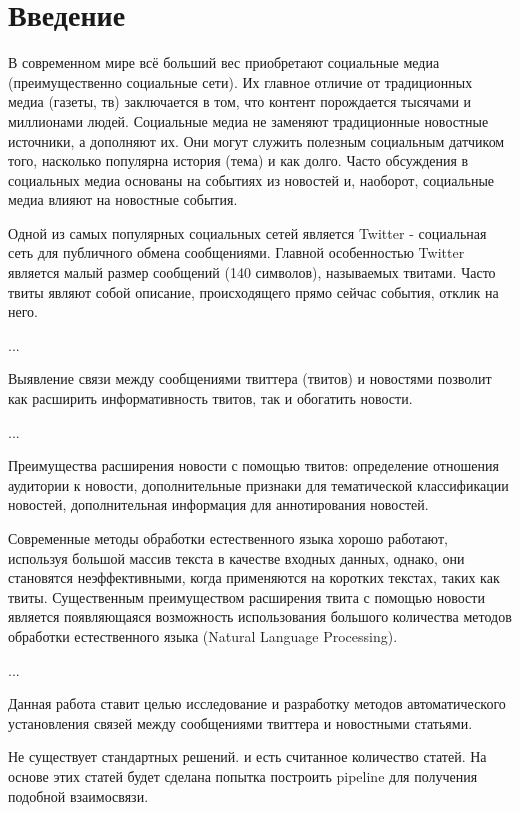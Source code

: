 \section*{Введение}
    В современном мире всё больший вес приобретают социальные медиа (преимущественно социальные сети). Их главное отличие от традиционных медиа (газеты, тв) заключается в том, что контент порождается тысячами и миллионами людей. Социальные медиа не заменяют традиционные новостные источники, а дополняют их. Они могут служить полезным социальным датчиком того, насколько популярна история (тема) и как долго. Часто обсуждения в социальных медиа основаны на событиях из новостей и, наоборот, социальные медиа влияют на новостные события.

    Одной из самых популярных социальных сетей является Twitter - социальная сеть для публичного обмена сообщениями. Главной особенностью Twitter является малый размер сообщений (140 символов), называемых твитами. Часто твиты являют собой описание, происходящего прямо сейчас события, отклик на него.

    ...

    Выявление связи между сообщениями твиттера (твитов) и новостями позволит как расширить информативность твитов, так и обогатить новости.

    ...

    Преимущества расширения новости с помощью твитов: определение отношения аудитории к новости, дополнительные признаки для тематической классификации новостей, дополнительная информация для аннотирования новостей.

    Современные методы обработки естественного языка хорошо работают, используя большой массив текста в качестве входных данных, однако, они становятся неэффективными, когда применяются на коротких текстах, таких как твиты. Существенным преимуществом расширения твита с помощью новости является появляющаяся возможность использования большого количества методов обработки естественного языка (Natural Language Processing).

    ...


    Данная работа ставит целью исследование и разработку методов автоматического установления связей между сообщениями твиттера и новостными статьями.

    {\color{red} Не существует стандартных решений. и есть считанное количество статей. На основе этих статей будет сделана попытка построить pipeline для получения подобной взаимосвязи.}

    \clearpage